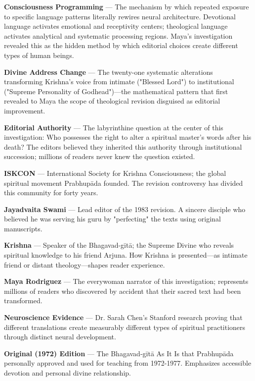 \documentclass[11pt,twoside]{book}
\begin{document}
\textbf{\textbf{Consciousness Programming}} — The mechanism by which repeated exposure to specific language patterns literally rewires neural architecture. Devotional language activates emotional and receptivity centers; theological language activates analytical and systematic processing regions. Maya's investigation revealed this as the hidden method by which editorial choices create different types of human beings.

\textbf{\textbf{Divine Address Change}} — The twenty-one systematic alterations transforming Krishna's voice from intimate ("Blessed Lord") to institutional ("Supreme Personality of Godhead")—the mathematical pattern that first revealed to Maya the scope of theological revision disguised as editorial improvement.

\textbf{\textbf{Editorial Authority}} — The labyrinthine question at the center of this investigation: Who possesses the right to alter a spiritual master's words after his death? The editors believed they inherited this authority through institutional succession; millions of readers never knew the question existed.

\textbf{\textbf{ISKCON}} — International Society for Krishna Consciousness; the global spiritual movement Prabhupāda founded. The revision controversy has divided this community for forty years.

\textbf{\textbf{Jayadvaita Swami}} — Lead editor of the 1983 revision. A sincere disciple who believed he was serving his guru by "perfecting" the texts using original manuscripts.

\textbf{\textbf{Krishna}} — Speaker of the Bhagavad-gītā; the Supreme Divine who reveals spiritual knowledge to his friend Arjuna. How Krishna is presented—as intimate friend or distant theology—shapes reader experience.

\textbf{\textbf{Maya Rodriguez}} — The everywoman narrator of this investigation; represents millions of readers who discovered by accident that their sacred text had been transformed.

\textbf{\textbf{Neuroscience Evidence}} — Dr. Sarah Chen's Stanford research proving that different translations create measurably different types of spiritual practitioners through distinct neural development.

\textbf{\textbf{Original (1972) Edition}} — The Bhagavad-gītā As It Is that Prabhupāda personally approved and used for teaching from 1972-1977. Emphasizes accessible devotion and personal divine relationship.
\end{document}
